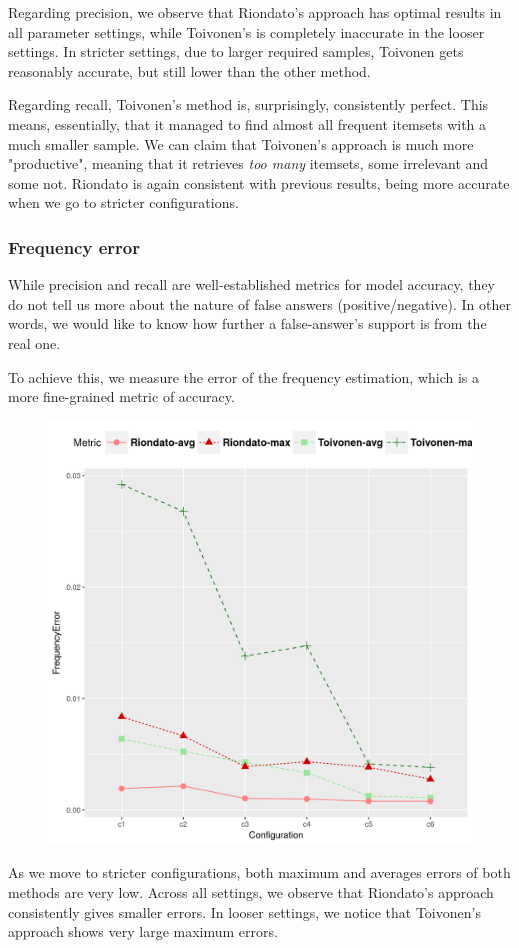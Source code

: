 \documentclass[11pt]{sigplanconf}
\begin{document}
Regarding precision, we observe that Riondato's approach has optimal results in all parameter settings, while Toivonen's is completely inaccurate in the looser settings. In stricter settings, due to larger required samples, Toivonen gets reasonably accurate, but still lower than the other method.

Regarding recall, Toivonen's method is, surprisingly, consistently perfect. This means, essentially, that it managed to find almost all frequent itemsets with a much smaller sample. We can claim that Toivonen's approach is much more "productive", meaning that it retrieves \textit{too many} itemsets, some irrelevant and some not. Riondato is again consistent with previous results, being more accurate when we go to stricter configurations.

\subsubsection{Frequency error}
While precision and recall are well-established metrics for model accuracy, they do not tell us more about the nature of false answers (positive/negative). In other words, we would like to know how further a false-answer's support is from the real one.

To achieve this, we measure the error of the frequency estimation, which is a more fine-grained metric of accuracy.
\begin{figure}[h!]
\centering
\includegraphics[width=.7\columnwidth]{T40I10D100K.dat/freq.png}
\end{figure}
As we move to stricter configurations, both maximum and averages errors of both methods are very low. Across all settings, we observe that Riondato's approach consistently gives smaller errors. In looser settings, we notice that Toivonen's approach shows very large maximum errors.
\end{document}
